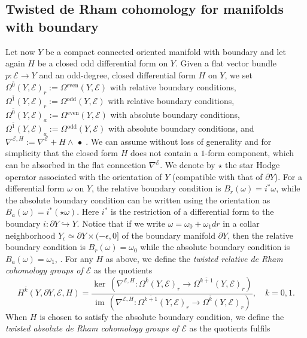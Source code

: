 \documentclass[12pt]{amsart}
\theoremstyle{plain}
\theoremstyle{definition}
\theoremstyle{remark}
\begin{document}
\subsection{Twisted de Rham cohomology for manifolds with boundary}\label{sect:twistedDR} 
{{Let now $Y$ be a compact connected oriented manifold with boundary and let again $H$ be a closed odd differential form on $Y$. }} Given a flat vector bundle $p\colon{\mathcal E}\to Y$ and an odd-degree,
closed differential form $H$ on $Y$, we set 
$\Omega^{\bar 0}(Y,{\mathcal E})_r:=\Omega{^{\mathrm{even}}}(Y,{\mathcal E})$ with relative boundary conditions,
$\Omega^{\bar 1}(Y,{\mathcal E})_r:=\Omega{^{\mathrm{odd}}}(Y,{\mathcal E})$ with relative boundary conditions,
$\Omega^{\bar 0}(Y,{\mathcal E})_a:=\Omega{^{\mathrm{even}}}(Y,{\mathcal E})$ with absolute boundary conditions,
$\Omega^{\bar 1}(Y,{\mathcal E})_a:=\Omega{^{\mathrm{odd}}}(Y,{\mathcal E})$ with absolute boundary conditions,
and $\nabla^{{\mathcal E},H}:=\nabla^{\mathcal E}+H\wedge\,{{\bullet}}\;$.
{{We can assume without loss of generality and for simplicity that the closed form}} $H$ does not contain a $1$-form
component, which can be absorbed in the flat connection $\nabla^{\mathcal E}$. {{We denote by $\star$ the star Hodge operator associated with the orientation of $Y$ (compatible with that of $\partial Y$).
For a differential form $\omega$ on $Y$, the relative boundary condition is $B_r(\omega)=i^*\omega$, while the absolute 
boundary condition can be written using the orientation as $B_a(\omega)= i^*(\star\omega)$. Here $i^*$ is the restriction of a differential form to the boundary 
$i:\partial Y \hookrightarrow Y$. Notice that  if we write $\omega=\omega_0+\omega_1 dr$ in a collar neighborhood 
$Y_\epsilon\simeq \partial Y\times (-\epsilon, 0]$ of the boundary manifold 
$\partial Y$, then the relative boundary condition is $B_r(\omega)=\omega_0$ while the absolute 
boundary condition is  $B_a(\omega)= \omega_1$, \cite{GilkeyBook}. }}
For any $H$ as above, we define the {\it twisted relative de Rham cohomology groups of ${\mathcal E}$} as the quotients
$$
H^{\bar k}(Y, \partial Y,{\mathcal E},H)=
\frac{\ker\,(\nabla^{{\mathcal E},H}\colon\Omega^{\bar k}({{Y}},{\mathcal E})_r\to
 \Omega^{\overline{k+1}}({{Y}},{\mathcal E})_r)}
{{\operatorname{im}}\,(\nabla^{{\mathcal E},H}\colon\Omega^{\overline{k+1}}({{Y}},{\mathcal E})_r\to
 \Omega^{\bar k}({{Y}},{\mathcal E})_r)},\quad k=0,1.
$$
{{When $H$ is chosen to satisfy the absolute boundary condition, }} we define the {\it twisted absolute de Rham cohomology groups of ${\mathcal E}$} as the quotients fulfils
\end{document}
